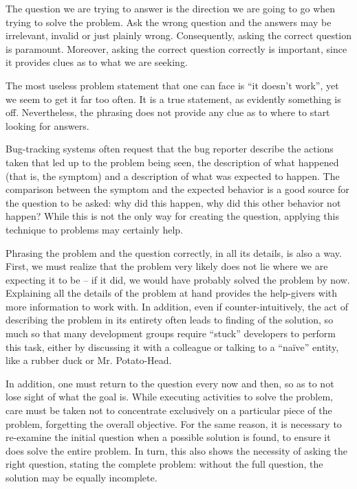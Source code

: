 The question we are trying to answer is the direction we are going to go when trying to solve the problem. Ask the wrong question and the answers may be irrelevant, invalid or just plainly wrong. Consequently, asking the correct question is paramount. Moreover, asking the correct question correctly is important, since it provides clues as to what we are seeking.

The most useless problem statement that one can face is ``it doesn’t work'', yet we seem to get it far too often. It is a true statement, as evidently something is off. Nevertheless, the phrasing does not provide any clue as to where to start looking for answers.

Bug-tracking systems often request that the bug reporter describe the actions taken that led up to the problem being seen, the description of what happened (that is, the symptom) and a description of what was expected to happen. The comparison between the symptom and the expected behavior is a good source for the question to be asked: why did this happen, why did this other behavior not happen? While this is not the only way for creating the question, applying this technique to problems may certainly help.

Phrasing the problem and the question correctly, in all its details, is also a way. First, we must realize that the problem very likely does not lie where we are expecting it to be -- if it did, we would have probably solved the problem by now. Explaining all the details of the problem at hand provides the help-givers with more information to work with. In addition, even if counter-intuitively, the act of describing the problem in its entirety often leads to finding of the solution, so much so that many development groups require ``stuck'' developers to perform this task, either by discussing it with a colleague or talking to a ``naïve'' entity, like a rubber duck or Mr. Potato-Head.

In addition, one must return to the question every now and then, so as to not lose sight of what the goal is. While executing activities to solve the problem, care must be taken not to concentrate exclusively on a particular piece of the problem, forgetting the overall objective. For the same reason, it is necessary to re-examine the initial question when a possible solution is found, to ensure it does solve the entire problem. In turn, this also shows the necessity of asking the right question, stating the complete problem: without the full question, the solution may be equally incomplete.

